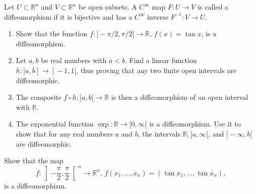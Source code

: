 \documentclass[en, oneside]{vivi}
\begin{document}
\begin{prob}
    Let $U \subset \mathbb{R}^n$ and $V \subset \mathbb{R}^n$ be open subsets. A $C^\infty$ map $F : U \to V$ is called a diffeomorphism if it is bijective and has a $C^\infty$ inverse $F^{-1} : V \to U$.
    \begin{enumerate}[label=(\alph*)]
        \item Show that the function $f : ]-\pi/2, \pi/2[ \to \mathbb{R}, \, f(x) = \tan x$, is a diffeomorphism.
        \item Let $a, b$ be real numbers with $a < b$. Find a linear function $h : ]a, b[ \to ]-1, 1[$, thus proving that any two finite open intervals are diffeomorphic.
        \item The composite $f \circ h : ]a, b[ \to \mathbb{R}$ is then a diffeomorphism of an open interval with $\mathbb{R}$.
        \item The exponential function $\exp : \mathbb{R} \to ]0, \infty[$ is a diffeomorphism. Use it to show that for any real numbers $a$ and $b$, the intervals $\mathbb{R}, ]a, \infty[$, and $]-\infty, b[$ are diffeomorphic.
    \end{enumerate}
\end{prob}

\begin{prob}
    Show that the map
    \begin{equation*}
        f : \left]-\frac{\pi}{2}, \frac{\pi}{2}\right[^n \to \mathbb{R}^n, \, f(x_1, \ldots, x_n) = (\tan x_1, \ldots, \tan x_n),
    \end{equation*}
    is a diffeomorphism.
\end{prob}
\end{document}
